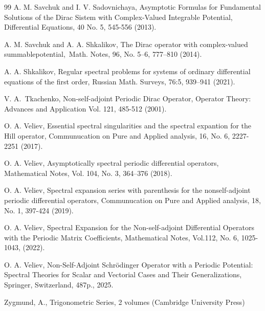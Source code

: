 \documentclass{article}%
\begin{document}
\begin{thebibliography}{99}
\bibitem {}A. M. Savchuk and I. V. Sadovnichaya, Asymptotic Formulas for
Fundamental Solutions of the Dirac Sistem with Complex-Valued Integrable
Potential, Differential Equations, 40 No. 5, 545-556 (2013).

\bibitem {}A. M. Savchuk and A. A. Shkalikov, The Dirac operator with
complex-valued summablepotential,\ Math. Notes, 96, No. 5--6, 777--810 (2014).

\bibitem {}A. A. Shkalikov, Regular spectral problems for systems of ordinary
differential equations of the first order, Russian Math. Surveys, 76:5,
939--941 (2021).

\bibitem {}V. A.\ Tkachenko, Non-self-adjoint Periodic Dirac Operator,
Operator Theory: Advances and Application Vol. 121, 485-512 (2001).

\bibitem {}O. A. Veliev, Essential spectral singularities and the spectral
expantion for the Hill operator, Communucation on Pure and Applied analysis,
16, No. 6, 2227-2251 (2017).

\bibitem {}O. A. Veliev, Asymptotically spectral periodic differential
operators, Mathematical Notes, Vol. 104, No. 3, 364--376 (2018).

\bibitem {}O. A. Veliev, Spectral expansion series with parenthesis for the
nonself-adjoint periodic differential operators, Communucation on Pure and
Applied analysis, 18, No. 1, 397-424 (2019).

\bibitem {}O. A. Veliev, Spectral Expansion for the Non-self-adjoint
Differential Operators with the Periodic Matrix Coefficients, Mathematical
Notes, Vol.112, No. 6, 1025-1043, (2022).

\bibitem {}O. A. Veliev, Non-Self-Adjoint Schr\"{o}dinger Operator with a
Periodic Potential: Spectral Theories for Scalar and Vectorial Cases and Their
Generalizations, Springer, Switzerland, 487p., 2025.

\bibitem {}Zygmund, A., Trigonometric Series, 2 volumes (Cambridge University Press)
\end{thebibliography}
\end{document}
